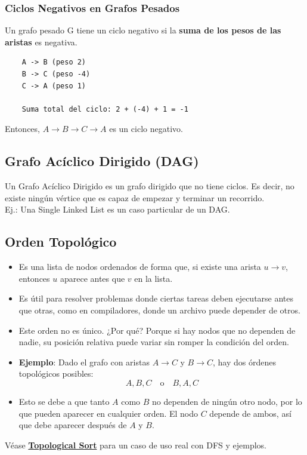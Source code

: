 \documentclass[10pt,a4paper]{article}
\begin{document}
\subsubsection*{Ciclos Negativos en Grafos Pesados}
Un grafo pesado G tiene un ciclo negativo si la \textbf{suma de los pesos de las aristas} es negativa. 
\begin{lstlisting}
    A -> B (peso 2)
    B -> C (peso -4)
    C -> A (peso 1)

    Suma total del ciclo: 2 + (-4) + 1 = -1
\end{lstlisting}
Entonces, $ A \rightarrow B \rightarrow C \rightarrow A$ es un ciclo negativo.
\subsection*{Grafo Acíclico Dirigido (DAG)}
Un Grafo Acíclico Dirigido es un grafo dirigido que no tiene ciclos. Es decir, no existe ningún vértice que es capaz de empezar y terminar un recorrido. \\
Ej.: Una Single Linked List es un caso particular de un DAG.
\subsection*{Orden Topológico}
\begin{itemize}
    \item Es una lista de nodos ordenados de forma que, si existe una arista $u \rightarrow v$, entonces $u$ aparece antes que $v$ en la lista.
    \item Es útil para resolver problemas donde ciertas tareas deben ejecutarse antes que otras, como en compiladores, donde un archivo puede depender de otros.
    \item Este orden no es único. ¿Por qué? Porque si hay nodos que no dependen de nadie, su posición relativa puede variar sin romper la condición del orden.
    \item \textbf{Ejemplo}: Dado el grafo con aristas $A \rightarrow C$ y $B \rightarrow C$, hay dos órdenes topológicos posibles: 
    \[
    A, B, C \quad \text{o} \quad B, A, C
    \]
    \item Esto se debe a que tanto $A$ como $B$ no dependen de ningún otro nodo, por lo que pueden aparecer en cualquier orden. El nodo $C$ depende de ambos, así que debe aparecer después de $A$ y $B$.
\end{itemize}
Véase \hyperref[subsubsec:topological_sort]{\textbf{Topological Sort}} para un caso de uso real con DFS y ejemplos. 
\end{document}
